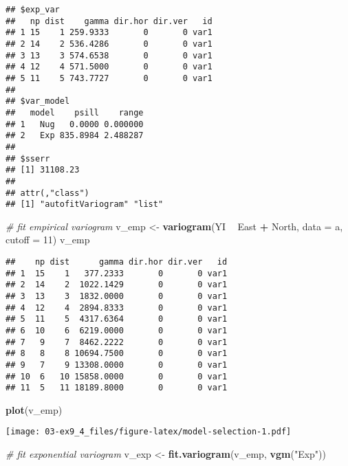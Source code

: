 \documentclass[]{book}
\newenvironment{Shaded}{\begin{snugshade}}{\end{snugshade}}
\newcommand{\CommentTok}[1]{\textcolor[rgb]{0.56,0.35,0.01}{\textit{#1}}}
\newcommand{\DataTypeTok}[1]{\textcolor[rgb]{0.13,0.29,0.53}{#1}}
\newcommand{\DecValTok}[1]{\textcolor[rgb]{0.00,0.00,0.81}{#1}}
\newcommand{\KeywordTok}[1]{\textcolor[rgb]{0.13,0.29,0.53}{\textbf{#1}}}
\newcommand{\NormalTok}[1]{#1}
\newcommand{\OperatorTok}[1]{\textcolor[rgb]{0.81,0.36,0.00}{\textbf{#1}}}
\newcommand{\StringTok}[1]{\textcolor[rgb]{0.31,0.60,0.02}{#1}}
\begin{document}
\begin{verbatim}
## $exp_var
##   np dist    gamma dir.hor dir.ver   id
## 1 15    1 259.9333       0       0 var1
## 2 14    2 536.4286       0       0 var1
## 3 13    3 574.6538       0       0 var1
## 4 12    4 571.5000       0       0 var1
## 5 11    5 743.7727       0       0 var1
## 
## $var_model
##   model    psill    range
## 1   Nug   0.0000 0.000000
## 2   Exp 835.8984 2.488287
## 
## $sserr
## [1] 31108.23
## 
## attr(,"class")
## [1] "autofitVariogram" "list"
\end{verbatim}

\begin{Shaded}
\begin{Highlighting}[]
\CommentTok{# fit empirical variogram}
\NormalTok{v_emp <-}\StringTok{ }\KeywordTok{variogram}\NormalTok{(YI }\OperatorTok{~}\StringTok{ }\NormalTok{East }\OperatorTok{+}\StringTok{ }\NormalTok{North, }\DataTypeTok{data =}\NormalTok{ a, }\DataTypeTok{cutoff =} \DecValTok{11}\NormalTok{)}
\NormalTok{v_emp}
\end{Highlighting}
\end{Shaded}

\begin{verbatim}
##    np dist      gamma dir.hor dir.ver   id
## 1  15    1   377.2333       0       0 var1
## 2  14    2  1022.1429       0       0 var1
## 3  13    3  1832.0000       0       0 var1
## 4  12    4  2894.8333       0       0 var1
## 5  11    5  4317.6364       0       0 var1
## 6  10    6  6219.0000       0       0 var1
## 7   9    7  8462.2222       0       0 var1
## 8   8    8 10694.7500       0       0 var1
## 9   7    9 13308.0000       0       0 var1
## 10  6   10 15858.0000       0       0 var1
## 11  5   11 18189.8000       0       0 var1
\end{verbatim}

\begin{Shaded}
\begin{Highlighting}[]
\KeywordTok{plot}\NormalTok{(v_emp)}
\end{Highlighting}
\end{Shaded}

\texttt{[image: 03-ex9\_4\_files/figure-latex/model-selection-1.pdf]}

\begin{Shaded}
\begin{Highlighting}[]
\CommentTok{# fit exponential variogram}
\NormalTok{v_exp <-}\StringTok{ }\KeywordTok{fit.variogram}\NormalTok{(v_emp, }\KeywordTok{vgm}\NormalTok{(}\StringTok{"Exp"}\NormalTok{))}
\end{Highlighting}
\end{Shaded}
\end{document}
